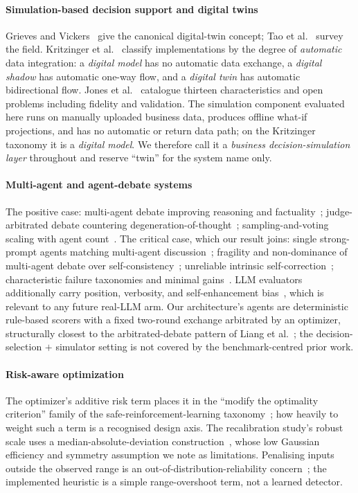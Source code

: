\documentclass[conference]{IEEEtran}
\begin{document}
\paragraph{Simulation-based decision support and digital twins}
Grieves and Vickers~\cite{Grieves2017} give the canonical digital-twin concept;
Tao et al.~\cite{Tao2019} survey the field. Kritzinger et al.~\cite{Kritzinger2018}
classify implementations by the degree of \emph{automatic} data integration: a
\emph{digital model} has no automatic data exchange, a \emph{digital shadow} has
automatic one-way flow, and a \emph{digital twin} has automatic bidirectional
flow. Jones et al.~\cite{Jones2020} catalogue thirteen characteristics and open
problems including fidelity and validation. The simulation component evaluated
here runs on manually uploaded business data, produces offline what-if
projections, and has no automatic or return data path; on the Kritzinger
taxonomy it is a \emph{digital model}. We therefore call it a \emph{business
decision-simulation layer} throughout and reserve ``twin'' for the system name
only.

\paragraph{Multi-agent and agent-debate systems}
The positive case: multi-agent debate improving reasoning and
factuality~\cite{Du2023}; judge-arbitrated debate countering
degeneration-of-thought~\cite{Liang2024}; sampling-and-voting scaling with agent
count~\cite{Li2024}. The critical case, which our result joins: single
strong-prompt agents matching multi-agent discussion~\cite{Wang2024}; fragility
and non-dominance of multi-agent debate over self-consistency~\cite{Smit2024};
unreliable intrinsic self-correction~\cite{Huang2024}; characteristic failure
taxonomies and minimal gains~\cite{Cemri2025}. LLM evaluators additionally carry
position, verbosity, and self-enhancement bias~\cite{Zheng2023}, which is
relevant to any future real-LLM arm. Our architecture's agents are deterministic
rule-based scorers with a fixed two-round exchange arbitrated by an optimizer,
structurally closest to the arbitrated-debate pattern of Liang et
al.~\cite{Liang2024}; the decision-selection $+$ simulator setting is not covered
by the benchmark-centred prior work.

\paragraph{Risk-aware optimization}
The optimizer's additive risk term places it in the ``modify the optimality
criterion'' family of the safe-reinforcement-learning taxonomy~\cite{Garcia2015};
how heavily to weight such a term is a recognised design axis. The recalibration
study's robust scale uses a median-absolute-deviation
construction~\cite{Rousseeuw1993}, whose low Gaussian efficiency and symmetry
assumption we note as limitations. Penalising inputs outside the observed range
is an out-of-distribution-reliability concern~\cite{Yang2024}; the implemented
heuristic is a simple range-overshoot term, not a learned detector.
\end{document}
